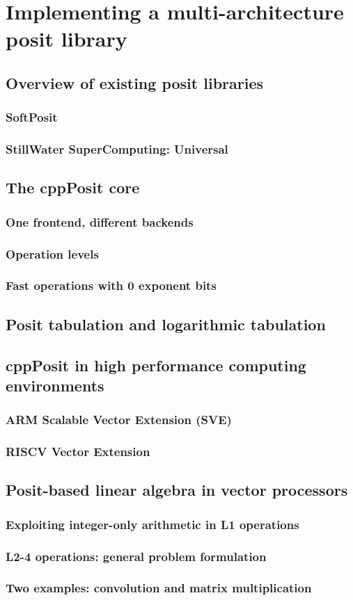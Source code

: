 \chapter{Implementing a multi-architecture posit library}
\section{Overview of existing posit libraries}
\subsection{SoftPosit}
\subsection{StillWater SuperComputing: Universal}

\section{The cppPosit core}\label{sec:cppPositCore}
\subsection{One frontend, different backends}
\subsection{Operation levels}
\subsection{Fast operations with 0 exponent bits}
\section{Posit tabulation and logarithmic tabulation}

\section{cppPosit in high performance computing environments}
\subsection{ARM Scalable Vector Extension (SVE)}
\subsection{RISCV Vector Extension}

\section{Posit-based linear algebra in vector processors}
\subsection{Exploiting integer-only arithmetic in L1 operations}
\subsection{L2-4 operations: general problem formulation}
\subsection{Two examples: convolution and matrix multiplication}

